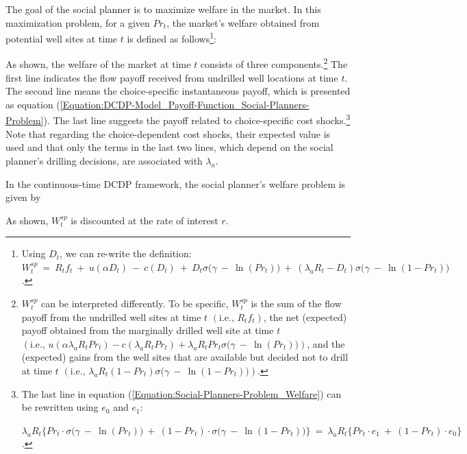 The goal of the social planner is to maximize welfare in the market. In this maximization problem, for a given $Pr_{t}$, the market's welfare obtained from potential well sites at time $t$ is defined as follows\footnote{Using $D_{t}$, we can re-write the definition: $W_{t}^{sp} \ = \ R_{t} f_{t} \ + \ u(\alpha D_{t}) \ - \ c(D_{t}) \ + \ D_{t} \sigma \big( \gamma \ - \ \ln(Pr_{t}) \big) \ + \ (\lambda_{a} R_{t} - D_{t}) \sigma \big( \gamma \ - \ \ln(1 - Pr_{t}) \big)$.}:

As shown, the welfare of the market at time $t$ consists of three components.\footnote{$W_{t}^{sp}$ can be interpreted differently. To be specific, $W_{t}^{sp}$ is the sum of the flow payoff from the undrilled well sites at time $t$ $\left( \text{i.e., } R_{t} f_{t} \right)$, the net (expected) payoff obtained from the marginally drilled well site at time $t$ $\left( \text{i.e., } u(\alpha \lambda_{a} R_{t} Pr_{t}) - c(\lambda_{a} R_{t} Pr_{t}) + \lambda_{a} R_{t} Pr_{t} \sigma \big( \gamma \ - \ \ln(Pr_{t}) \big) \right)$, and the (expected) gains from the well sites that are available but decided not to drill at time $t$ $\left( \text{i.e., } \lambda_{a} R_{t} (1 - Pr_{t}) \sigma \big( \gamma \ - \ \ln(1 - Pr_{t}) \big) \right)$.} The first line indicates the flow payoff received from undrilled well locations at time $t$. The second line means the choice-specific instantaneous payoff, which is presented as equation (\ref{Equation:DCDP-Model_Payoff-Function_Social-Planners-Problem}). The last line suggests the payoff related to choice-specific cost shocks.\footnote{The last line in equation (\ref{Equation:Social-Planners-Problem_Welfare}) can be rewritten using $e_{0}$ and $e_{1}$: \par \hspace{0.3cm} $\lambda_{a} R_{t} \big\{ Pr_{t} \cdot \sigma \big( \gamma \ - \ \ln(Pr_{t}) \big) \ + \ (1 - Pr_{t}) \cdot \sigma \big( \gamma \ - \ \ln(1 - Pr_{t}) \big) \big\} \ = \ \lambda_{a} R_{t} \big\{ Pr_{t} \cdot e_{1} \ + \ (1 - Pr_{t}) \cdot e_{0} \big\}$.} Note that regarding the choice-dependent cost shocks, their expected value is used and that only the terms in the last two lines, which depend on the social planner's drilling decisions, are associated with $\lambda_{a}$. 

In the continuous-time DCDP framework, the social planner's welfare problem is given by

As shown, $W_{t}^{sp}$ is discounted at the rate of interest $r$. 

